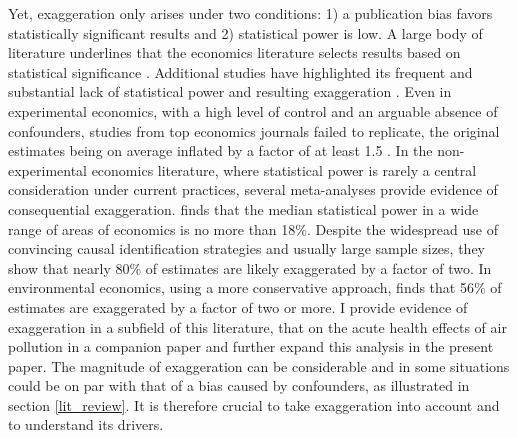 			Yet, exaggeration only arises under two conditions: 1) a publication bias favors statistically significant results and 2) statistical power is low. A large body of literature underlines that the economics literature selects results based on statistical significance \citep[for instance]{rosenthal_file_1979, brodeur_star_2016, andrews_identification_2019, abadie_statistical_2020, brodeur_methods_2020}. Additional studies have highlighted its frequent and substantial lack of statistical power and resulting exaggeration \citep{ioannidis_power_2017, ferraro_featureis_2020}. %
			Even in experimental economics, with a high level of control and an arguable absence of confounders, studies from top economics journals failed to replicate, the original estimates being on average inflated by a factor of at least 1.5 \citep{camerer_evaluating_2016}. In the non-experimental economics literature, where statistical power is rarely a central consideration under current practices, several meta-analyses provide evidence of consequential exaggeration. \cite{ioannidis_power_2017} finds that the median statistical power in a wide range of areas of economics is no more than 18\%. Despite the widespread use of convincing causal identification strategies and usually large sample sizes, they show that nearly 80\% of estimates are likely exaggerated by a factor of two. In environmental economics, using a more conservative approach, \cite{ferraro_featureis_2020} finds that 56\% of estimates are exaggerated by a factor of two or more. I provide evidence of exaggeration in a subfield of this literature, that on the acute health effects of air pollution in a companion paper \citep{bagilet_accurately_2023} and further expand this analysis in the present paper.  The magnitude of exaggeration can be considerable and in some situations could be on par with that of a bias caused by confounders, as illustrated in section \ref{lit_review}.
			It is therefore crucial to take exaggeration into account and to understand its drivers.
			
